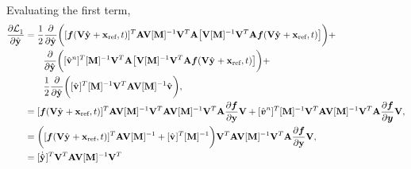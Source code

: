 \documentclass[3p,computermodern,10pt]{elsarticle}
\begin{document}
\begin{appendices}
\begin{align*}
\end{align*}
Evaluating the first term,
\begin{align*}
\frac{\partial  \objectiveControlArg{}_1 }{\partial \genstateyDiscreteArgnt{}{}} &= 
\frac{1}{2} \frac{\partial }{\partial \genstateyDiscreteArgnt{}{}} \bigg( [\velocity(\veloargsromy)]^T \stweightingMatArg{n} \basisspace [\massArgnt{n}]^{-1} \basisspace^T \stweightingMatArg{n}  \big[ \basisspace  [\massArgnt{n}]^{-1}\basisspace^T
\stweightingMatArg{n}  \velocity(\veloargsromy) \big] \bigg) +  \\
& \qquad \frac{\partial }{\partial \genstateyDiscreteArgnt{}{}} \bigg( [\controllerDiscreteDumArgnt{n}]^T [\massArgnt{n}]^{-1} \basisspace^T \stweightingMatArg{n}  \big[ \basisspace  [\massArgnt{n}]^{-1}\basisspace^T
\stweightingMatArg{n}  \velocity(\veloargsromy) \big] \bigg) + \\
& \qquad \frac{1}{2} \frac{\partial }{\partial \genstateyDiscreteArgnt{}{}} \bigg( [\controllerDiscreteDumArgnt{}]^T [\massArgnt{n}]^{-1} \basisspace^T \stweightingMatArg{n} \basisspace [\massArgnt{n}]^{-1} \controllerDiscreteDumArgnt{}\bigg) 
,\\ 
&= 
[\velocity(\veloargsromy)]^T \stweightingMatArg{n} \basisspace [\massArgnt{n}]^{-1} \basisspace^T \stweightingMatArg{n}  \basisspace  [\massArgnt{n}]^{-1}\basisspace^T
\stweightingMatArg{n}  \frac{\partial \velocity}{\partial \stateyDiscrete} \basisspace + 
[\controllerDumArgnt{n}]^T [\massArgnt{n}]^{-1} \basisspace^T \stweightingMatArg{n}   \basisspace  [\massArgnt{n}]^{-1}\basisspace^T
\stweightingMatArg{n} \frac{\partial \velocity}{\partial \statey} \basisspace , \\ 
&= 
\bigg( [\velocity(\veloargsromy)]^T \stweightingMatArg{n} \basisspace [\massArgnt{n}]^{-1}  + [\controllerDiscreteDumArgnt{}]^T [\massArgnt{}]^{-1} \bigg)\basisspace^T  \stweightingMatArg{n}   \basisspace  [\massArgnt{n}]^{-1}\basisspace^T
\stweightingMatArg{n} \frac{\partial \velocity}{\partial \stateyDiscrete} \basisspace ,\\
&= 
[\genstateyDiscreteDotArgnt{} ]^T \basisspace^T  \stweightingMatArg{n}   \basisspace  [\massArgnt{n}]^{-1}\basisspace^T

\end{align*}
\end{appendices}
\end{document}
